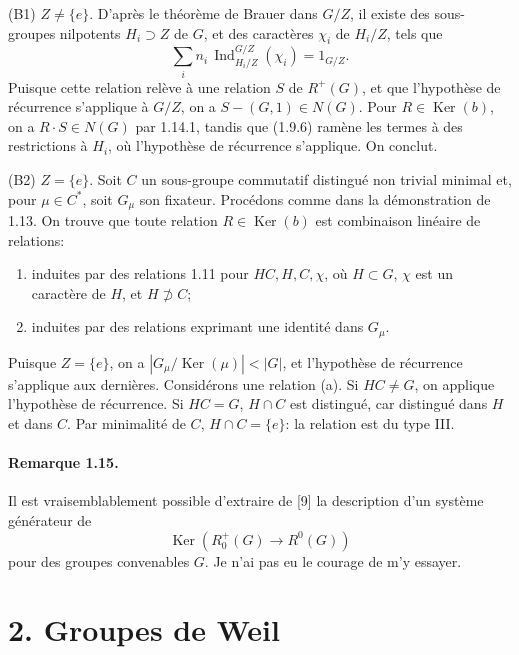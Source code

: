 \documentclass[10pt]{article}
\newcommand{\Ind}{\operatorname{Ind}}
\providecommand{\Ker}{\operatorname{Ker}}
\providecommand{\Ind}{\operatorname{Ind}}
\providecommand{\Ker}{\operatorname{Ker}}
\begin{document}
(B1) \(Z\ne\{e\}\). D'après le théorème de Brauer dans \(G/Z\), il existe des sous-groupes nilpotents \(H_i\supset Z\) de \(G\), et des caractères \(\chi_i\) de \(H_i/Z\), tels que
\[
\sum_i n_i\,\Ind_{H_i/Z}^{G/Z}(\chi_i)=1_{G/Z}.
\]
Puisque cette relation relève à une relation \(S\) de \(R^+(G)\), et que l'hypothèse de récurrence s'applique à \(G/Z\), on a \(S-(G,1)\in N(G)\). Pour \(R\in\Ker(b)\), on a \(R\cdot S\in N(G)\) par 1.14.1, tandis que (1.9.6) ramène les termes à des restrictions à \(H_i\), où l'hypothèse de récurrence s'applique. On conclut.

(B2) \(Z=\{e\}\). Soit \(C\) un sous-groupe commutatif distingué non trivial minimal et, pour \(\mu\in C^*\), soit \(G_\mu\) son fixateur. Procédons comme dans la démonstration de 1.13. On trouve que toute relation \(R\in\Ker(b)\) est combinaison linéaire de relations:
\begin{enumerate}[label=(\alph*)]
\item induites par des relations 1.11 pour \(HC,H,C,\chi\), où \(H\subset G\), \(\chi\) est un caractère de \(H\), et \(H\not\supset C\);
\item induites par des relations exprimant une identité dans \(G_\mu\).
\end{enumerate}
Puisque \(Z=\{e\}\), on a \(|G_\mu/\Ker(\mu)|<|G|\), et l'hypothèse de récurrence s'applique aux dernières. Considérons une relation (a). Si \(HC\ne G\), on applique l'hypothèse de récurrence. Si \(HC=G\), \(H\cap C\) est distingué, car distingué dans \(H\) et dans \(C\). Par minimalité de \(C\), \(H\cap C=\{e\}\): la relation est du type III.

\paragraph{Remarque 1.15.} Il est vraisemblablement possible d'extraire de [9] la description d'un système générateur de
\[
\Ker(R^+_0(G)\longrightarrow R^0(G))
\]
pour des groupes convenables \(G\). Je n'ai pas eu le courage de m'y essayer.

\section*{2. Groupes de Weil}
\end{document}
